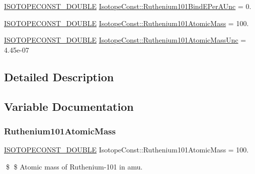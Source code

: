 \begin{DoxyCompactItemize}
\mbox{\hyperlink{group___isotope_const-_macros_ga8f45a7272ce02c0b4c65c44636ed719a}{I\+S\+O\+T\+O\+P\+E\+C\+O\+N\+S\+T\+\_\+\+D\+O\+U\+B\+LE}} \mbox{\hyperlink{group___isotope_const-_ruthenium-_ru101_ga3ef74a23d77c7786bafb1c72b249d5df}{Isotope\+Const\+::\+Ruthenium101\+Bind\+E\+Per\+A\+Unc}} = 0.
\item 
\mbox{\hyperlink{group___isotope_const-_macros_ga8f45a7272ce02c0b4c65c44636ed719a}{I\+S\+O\+T\+O\+P\+E\+C\+O\+N\+S\+T\+\_\+\+D\+O\+U\+B\+LE}} \mbox{\hyperlink{group___isotope_const-_ruthenium-_ru101_ga545e7750066b9119c908b3cceddf3cde}{Isotope\+Const\+::\+Ruthenium101\+Atomic\+Mass}} = 100.
\item 
\mbox{\hyperlink{group___isotope_const-_macros_ga8f45a7272ce02c0b4c65c44636ed719a}{I\+S\+O\+T\+O\+P\+E\+C\+O\+N\+S\+T\+\_\+\+D\+O\+U\+B\+LE}} \mbox{\hyperlink{group___isotope_const-_ruthenium-_ru101_ga8e84f621d6d768fcccd7652754c17d53}{Isotope\+Const\+::\+Ruthenium101\+Atomic\+Mass\+Unc}} = 4.\+45e-\/07
\end{DoxyCompactItemize}


\subsection{Detailed Description}


\subsection{Variable Documentation}
\mbox{\label{group___isotope_const-_ruthenium-_ru101_ga545e7750066b9119c908b3cceddf3cde}} 
\subsubsection{\texorpdfstring{Ruthenium101\+Atomic\+Mass}{Ruthenium101AtomicMass}}
{\footnotesize\ttfamily \mbox{\hyperlink{group___isotope_const-_macros_ga8f45a7272ce02c0b4c65c44636ed719a}{I\+S\+O\+T\+O\+P\+E\+C\+O\+N\+S\+T\+\_\+\+D\+O\+U\+B\+LE}} Isotope\+Const\+::\+Ruthenium101\+Atomic\+Mass = 100.}

\$ \$ Atomic mass of Ruthenium-\/101 in amu. \mbox{\label{group___isotope_const-_ruthenium-_ru101_ga8e84f621d6d768fcccd7652754c17d53}} 
